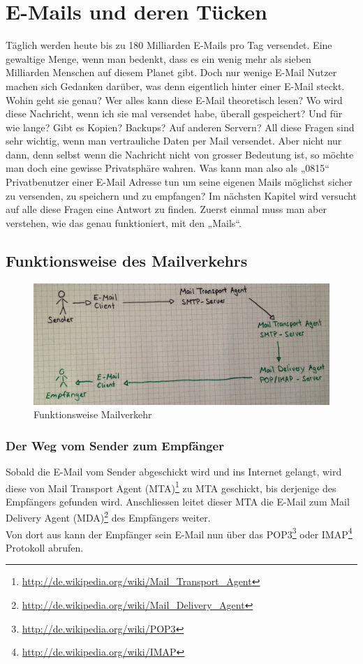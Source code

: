 \newpage
\section{E-Mails und deren Tücken}
Täglich werden heute bis zu 180 Milliarden E-Mails pro Tag versendet. Eine gewaltige Menge, wenn man bedenkt, dass es ein wenig mehr als sieben Milliarden Menschen auf diesem Planet gibt.
Doch nur wenige E-Mail Nutzer machen sich Gedanken darüber, was denn eigentlich hinter einer E-Mail steckt. Wohin geht sie genau? Wer alles kann diese E-Mail theoretisch lesen? Wo wird diese Nachricht, wenn ich sie mal versendet habe, überall gespeichert? Und für wie lange? Gibt es Kopien? Backups? Auf anderen Servern?
All diese Fragen sind sehr wichtig, wenn man vertrauliche Daten per Mail versendet. Aber nicht nur dann, denn selbst wenn die Nachricht nicht von grosser Bedeutung ist, so möchte man doch eine gewisse Privatsphäre wahren.
Was kann man also als „0815“ Privatbenutzer einer E-Mail Adresse tun um seine eigenen Mails möglichst sicher zu versenden, zu speichern und  zu empfangen?
Im nächsten Kapitel wird versucht auf alle diese Fragen eine Antwort zu finden. Zuerst einmal muss man aber verstehen, wie das genau funktioniert, mit den „Mails“.

\subsection{Funktionsweise des Mailverkehrs}

\begin{figure}[h]
\centering
\noindent\includegraphics[scale=0.14]{images/mailverkehr.jpg}
\caption{Funktionsweise Mailverkehr}
\end{figure}

\subsubsection{Der Weg vom Sender zum Empfänger}
Sobald die E-Mail vom Sender abgeschickt wird und ins Internet gelangt, wird diese von Mail Transport Agent (MTA)\footnote{\url{http://de.wikipedia.org/wiki/Mail_Transport_Agent}} zu MTA geschickt, bis derjenige des Empfängers gefunden wird. Anschliessen leitet dieser MTA die E-Mail zum Mail Delivery Agent (MDA)\footnote{\url{http://de.wikipedia.org/wiki/Mail_Delivery_Agent}} des Empfängers weiter. \\
Von dort aus kann der Empfänger sein E-Mail nun über das POP3\footnote{\url{http://de.wikipedia.org/wiki/POP3}} oder IMAP\footnote{\url{http://de.wikipedia.org/wiki/IMAP}} Protokoll abrufen.

